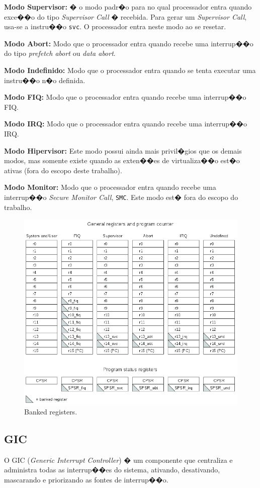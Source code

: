 \documentclass{ufscThesis/ufscThesis} %
\begin{document}
\textbf{Modo Supervisor:} � o modo padr�o para no qual processador entra quando exce��o do tipo \emph{Supervisor Call} � recebida.
Para gerar um \emph{Supervisor Call}, usa-se a instru��o \verb+svc+. O processador entra neste modo ao se resetar.

\textbf{Modo Abort:} Modo que o processador entra quando recebe uma interrup��o do tipo \emph{prefetch abort} ou \emph{data abort}.

\textbf{Modo Indefinido:} Modo que o processador entra quando se tenta executar uma instru��o n�o definida.

\textbf{Modo FIQ:} Modo que o processador entra quando recebe uma interrup��o FIQ.

\textbf{Modo IRQ:} Modo que o processador entra quando recebe uma interrup��o IRQ.

\textbf{Modo Hipervisor:} Este modo possui ainda mais privil�gios que os demais modos, mas somente existe quando as exten��es de virtualiza��o est�o ativas (fora do escopo deste trabalho).

\textbf{Modo Monitor:} Modo que o processador entra quando recebe uma interrup��o \emph{Secure Monitor Call}, \verb+SMC+. Este modo est� fora do escopo do trabalho.


\begin{figure}[ht!]
	\centerline{
    \includegraphics[width=12cm]{figuras/banked_registers}
	}
    \caption{Banked registers.}
\end{figure}



\subsection{GIC}
O GIC (\emph{Generic Interrupt Controller}) � um componente que centraliza e administra todas as interrup��es do sistema, ativando, desativando, mascarando e priorizando as fontes de interrup��o.
\end{document}
